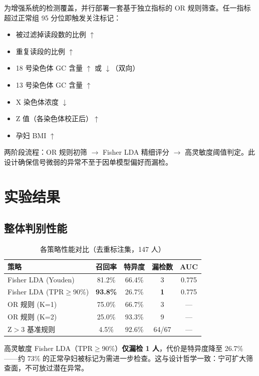 \documentclass{internal-report}
\begin{document}
为增强系统的检测覆盖，并行部署一套基于独立指标的 OR 规则筛查。任一指标超过正常组 95 分位即触发关注标记：

\begin{itemize}
    \item 被过滤掉读段数的比例 $\uparrow$
    \item 重复读段的比例 $\uparrow$
    \item 18 号染色体 GC 含量 $\uparrow$ 或 $\downarrow$（双向）
    \item 13 号染色体 GC 含量 $\uparrow$
    \item X 染色体浓度 $\downarrow$
    \item Z 值（各染色体校正后）$\uparrow$
    \item 孕妇 BMI $\uparrow$
\end{itemize}

两阶段流程：OR 规则初筛 $\to$ Fisher LDA 精细评分 $\to$ 高灵敏度阈值判定。此设计确保信号微弱的异常不至于因单模型偏好而漏检。

\section{实验结果}

\subsection{整体判别性能}

\begin{table}[H]
\centering
\caption{各策略性能对比（去重标注集，147 人）}
\label{tab:perf}
\begin{tabular}{lcccc}
\toprule
策略 & 召回率 & 特异度 & 漏检数 & AUC \\
\midrule
Fisher LDA (Youden)       & 81.2\% & 66.4\% & 3 & 0.775 \\
Fisher LDA (TPR$\geq$90\%) & \textbf{93.8\%} & 26.7\% & \textbf{1} & 0.775 \\
OR 规则 (K=1)             & 75.0\% & 66.7\% & 3 & — \\
OR 规则 (K=2)             & 25.0\% & 93.3\% & 9 & — \\
Z$>3$ 基准规则            & 4.5\% & 92.6\% & 64/67 & — \\
\bottomrule
\end{tabular}
\end{table}

高灵敏度 Fisher LDA（TPR$\geq$90\%）\textbf{仅漏检 1 人}，代价是特异度降至 26.7\%——约 73\% 的正常孕妇被标记为需进一步检查。这与设计哲学一致：宁可扩大筛查面，不可放过潜在异常。
\end{document}
